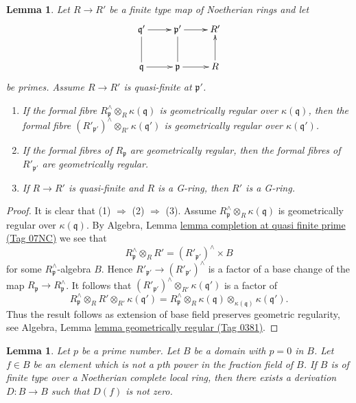 \documentclass{amsart}
\theoremstyle{plain}
\newtheorem{lemma}[subsection]{Lemma}
\theoremstyle{definition}
\theoremstyle{remark}
\numberwithin{equation}{subsection}
\begin{document}
\begin{lemma}
\label{lemma-G-ring-goes-up-quasi-finite}
Let $R \to R'$ be a finite type map of Noetherian rings and let
$$
\xymatrix{
\mathfrak q' \ar[r] & \mathfrak p' \ar[r] & R' \\
\mathfrak q \ar[r] \ar@{-}[u] &
\mathfrak p \ar[r] \ar@{-}[u] & R \ar[u]
}
$$
be primes. Assume $R \to R'$ is quasi-finite at $\mathfrak p'$.
\begin{enumerate}
\item If the formal fibre $R_\mathfrak p^\wedge \otimes_R \kappa(\mathfrak q)$
is geometrically regular over $\kappa(\mathfrak q)$, then the formal fibre
$(R'_{\mathfrak p'})^\wedge \otimes_{R'} \kappa(\mathfrak q')$
is geometrically regular over $\kappa(\mathfrak q')$.
\item If the formal fibres of $R_\mathfrak p$ are geometrically regular,
then the formal fibres of $R'_{\mathfrak p'}$ are geometrically regular.
\item If $R \to R'$ is quasi-finite and $R$ is a G-ring, then $R'$ is
a G-ring.
\end{enumerate}
\end{lemma}

\begin{proof}
It is clear that (1) $\Rightarrow$ (2) $\Rightarrow$ (3).
Assume $R_\mathfrak p^\wedge \otimes_R \kappa(\mathfrak q)$
is geometrically regular over $\kappa(\mathfrak q)$.
By Algebra, Lemma \href{https://stacks.math.columbia.edu/tag/07NC}{lemma completion at quasi finite prime (Tag 07NC)}
we see that
$$
R_\mathfrak p^\wedge \otimes_R R'
=
(R'_{\mathfrak p'})^\wedge \times B
$$
for some $R_\mathfrak p^\wedge$-algebra $B$. Hence
$R'_{\mathfrak p'} \to (R'_{\mathfrak p'})^\wedge$ is a factor of
a base change of the map $R_\mathfrak p \to R_\mathfrak p^\wedge$.
It follows that $(R'_{\mathfrak p'})^\wedge \otimes_{R'} \kappa(\mathfrak q')$
is a factor of
$$
R_\mathfrak p^\wedge \otimes_R R' \otimes_{R'} \kappa(\mathfrak q') =
R_\mathfrak p^\wedge \otimes_R \kappa(\mathfrak q)
\otimes_{\kappa(\mathfrak q)} \kappa(\mathfrak q').
$$
Thus the result follows as extension of base field preserves
geometric regularity, see
Algebra, Lemma \href{https://stacks.math.columbia.edu/tag/0381}{lemma geometrically regular (Tag 0381)}.
\end{proof}


\begin{lemma}
\label{lemma-find-D}
Let $p$ be a prime number. Let $B$ be a domain with $p = 0$ in $B$.
Let $f \in B$ be an element which is not a $p$th power in the fraction
field of $B$. If $B$ is of finite type over a Noetherian complete
local ring, then there exists a derivation $D : B \to B$ such that $D(f)$
is not zero.
\end{lemma}
\end{document}
